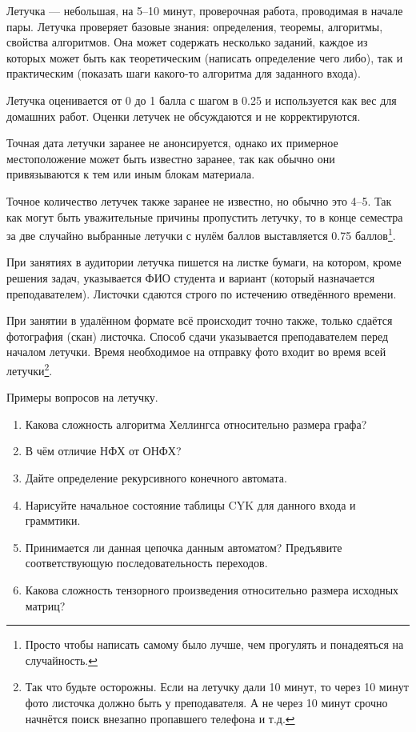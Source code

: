 Летучка --- небольшая, на 5--10 минут, проверочная работа, проводимая в начале пары. 
Летучка проверяет базовые знания: определения, теоремы, алгоритмы, свойства алгоритмов. 
Она может содержать несколько заданий, каждое из которых может быть как теоретическим (написать определение чего либо), так и практическим (показать шаги какого-то алгоритма для заданного входа).

Летучка оценивается от 0 до 1 балла с шагом в 0.25 и используется как вес для домашних работ. Оценки летучек не обсуждаются и не корректируются. 

Точная дата летучки заранее не анонсируется, однако их примерное местоположение может быть известно заранее, так как обычно они привязываются к тем или иным блокам материала.

Точное количество летучек также заранее не известно, но обычно это 4--5. Так как могут быть уважительные причины пропустить летучку, то в конце семестра за две случайно выбранные летучки с нулём баллов выставляется 0.75 баллов\footnote{Просто чтобы написать самому было лучше, чем прогулять и понадеяться на случайность.}. 

При занятиях в аудитории летучка пишется на листке бумаги, на котором, кроме решения задач, указывается ФИО студента и вариант (который назначается преподавателем). Листочки сдаются строго по истечению отведённого времени.

При занятии в удалённом формате всё происходит точно также, только сдаётся фотография (скан) листочка. Способ сдачи указывается преподавателем перед началом летучки. Время необходимое на отправку фото входит во время всей летучки\footnote{Так что будьте осторожны. Если на летучку дали 10 минут, то через 10 минут фото листочка должно быть у преподавателя. А не через 10 минут срочно начнётся поиск внезапно пропавшего телефона и т.д.}.

Примеры вопросов на летучку.
\begin{enumerate}
    \item Какова сложность алгоритма Хеллингса относительно размера графа?
    \item В чём отличие НФХ от ОНФХ?
    \item Дайте определение рекурсивного конечного автомата.
    \item Нарисуйте начальное состояние таблицы CYK для данного входа и граммтики.
    \item Принимается ли данная цепочка данным автоматом? Предъявите соответствующую последовательность переходов.
    \item Какова сложность тензорного произведения относительно размера исходных матриц?
\end{enumerate}